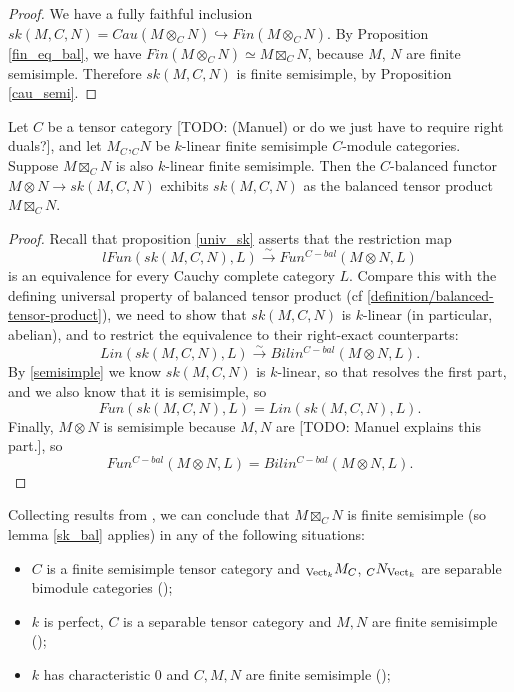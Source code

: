 \begin{proof}
  We have a fully faithful inclusion
  $sk(M,C,N)=Cau(M\otimes_C N)\hookrightarrow Fin(M\otimes_C N)$. By
  Proposition \ref{fin_eq_bal}, we have
  $Fin(M\otimes_C N)\simeq M\boxtimes_C N$, because $M$, $N$ are finite
  semisimple. Therefore $sk(M,C,N)$ is finite semisimple, by Proposition
  \ref{cau_semi}.
\end{proof}

\begin{lemma}\label{sk_bal}
  Let $C$ be a tensor category [TODO: (Manuel) or do we just have to require right duals?], and let $M_C$,$_{C}N$ be $k$-linear finite semisimple $C$-module categories. Suppose $M\boxtimes_C N$ is also $k$-linear finite semisimple. Then the
  $C$-balanced functor $M\otimes N\to sk(M,C,N)$ exhibits $sk(M,C,N)$ as the
  balanced tensor product $M\boxtimes_C N$.
\end{lemma}

\begin{proof}
  Recall that proposition \ref{univ_sk} asserts that the restriction map
  \[
   l Fun(sk(M,C,N),L) \xrightarrow{\sim} Fun^{C-bal}(M \otimes N,L)
  \]
  is an equivalence for every Cauchy complete category $L$. Compare this with
  the defining universal property of balanced tensor product (cf
  \ref{definition/balanced-tensor-product}), we need to show that $sk(M,C,N)$
  is $k$-linear (in particular, abelian), and to restrict the equivalence to
  their right-exact counterparts:
  \[
    Lin(sk(M,C,N),L) \xrightarrow{\sim} Bilin^{C-bal}(M \otimes N, L).
  \]
  By \ref{semisimple} we know $sk(M,C,N)$ is $k$-linear, so that resolves the
  first part, and we also know that it is semisimple, so
  \[
    Fun(sk(M,C,N), L) = Lin(sk(M,C,N), L).
  \]
  Finally, $M \otimes N$ is semisimple because $M, N$ are [TODO: Manuel
  explains this part.], so
  \[
    Fun^{C-bal}(M \otimes N, L) = Bilin^{C-bal}(M \otimes N, L).
  \]
\end{proof}

\begin{remark}\label{semisimple_douglas/dualizable-tensor-categories}
  Collecting results from \cite{douglas/dualizable-tensor-categories}, we can
  conclude that $M\boxtimes_C N$ is finite semisimple (so lemma \ref{sk_bal} applies) in any of the following
  situations:
  \begin{itemize}
    \item $C$ is a finite semisimple tensor category and $_{\operatorname{Vect}_k}M_C$,
    $_{C}N_{\operatorname{Vect}_k}$ are separable bimodule categories (\cite[Proposition 2.5.3,
    Theorem 2.5.5]{douglas/dualizable-tensor-categories});
    \item $k$ is perfect, $C$ is a separable tensor category and $M,N$ are
    finite semisimple (\cite[Proposition
    2.5.10]{douglas/dualizable-tensor-categories});
    \item $k$ has characteristic $0$ and $C,M,N$ are finite semisimple
    (\cite[Corollary 2.6.9]{douglas/dualizable-tensor-categories});
  \end{itemize}
\end{remark}

